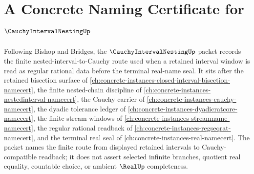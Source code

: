 \chapter{A Concrete Naming Certificate for $\CauchyIntervalNestingUp$}
\label{ch:concrete-instances-cauchy-interval-nesting-namecert}

Following Bishop and Bridges, the $\CauchyIntervalNestingUp$ packet records the finite nested-interval-to-Cauchy route used when a retained interval window is read as regular rational data before the terminal real-name seal. It sits after the retained bisection surface of \autoref{ch:concrete-instances-closed-interval-bisection-namecert}, the finite nested-chain discipline of \autoref{ch:concrete-instances-nestedinterval-namecert}, the Cauchy carrier of \autoref{ch:concrete-instances-cauchy-namecert}, the dyadic tolerance ledger of \autoref{ch:concrete-instances-dyadicratcore-namecert}, the finite stream windows of \autoref{ch:concrete-instances-streamname-namecert}, the regular rational readback of \autoref{ch:concrete-instances-regseqrat-namecert}, and the terminal real seal of \autoref{ch:concrete-instances-real-namecert}. The packet names the finite route from displayed retained intervals to Cauchy-compatible readback; it does not assert selected infinite branches, quotient real equality, countable choice, or ambient $\RealUp$ completeness.

